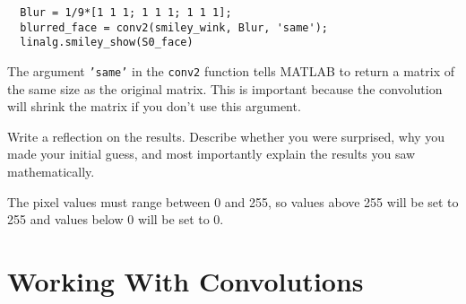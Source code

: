 \documentclass{ximera}
\begin{document}
\begin{problem}
\begin{enumerate}
\begin{verbatim}
  Blur = 1/9*[1 1 1; 1 1 1; 1 1 1];
  blurred_face = conv2(smiley_wink, Blur, 'same');
  linalg.smiley_show(S0_face)
\end{verbatim}

\begin{hint}
  The argument \texttt{'same'} in the \texttt{conv2} function tells MATLAB to return a matrix of the same size as the original matrix. This is important because the convolution will shrink the matrix if you don't use this argument.
\end{hint}

Write a reflection on the results. Describe whether you were surprised, why you made your initial guess, and most importantly explain the results you saw mathematically.

\begin{hint}
  The pixel values must range between 0 and 255, so values above 255 will be set to 255 and values below 0 will be set to 0.
\end{hint}

\end{enumerate}

\end{problem}

\section*{Working With Convolutions}
\end{document}
